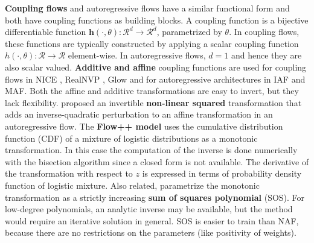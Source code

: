 

\textbf{Coupling flows} and autoregressive flows have a similar functional form and both have coupling functions as building blocks. A coupling function is a bijective differentiable function $\mathbf{h}(\cdot, \theta): \mathcal{R}^{d} \rightarrow \mathcal{R}^{d} $, parametrized by $\theta$. In coupling flows, these functions are typically constructed by applying a scalar coupling function $h(\cdot, \theta): \mathcal{R} \rightarrow \mathcal{R}$ element-wise. In autoregressive flows, $d = 1$ and hence they are also scalar valued. %
\textbf{Additive and affine} coupling functions are used for coupling flows in NICE \cite{dinh2014nice}, RealNVP \cite{dinh2016density}, Glow \cite{kingma2018glow} and for autoregressive architectures in IAF and MAF. Both the affine and additive transformations are easy to invert, but they lack flexibility.
\cite{ziegler2019latent} proposed an invertible \textbf{non-linear squared} transformation that adds an inverse-quadratic perturbation to an affine transformation in an autoregressive flow. 
The \textbf{Flow++ model} \cite{ho2019flow} uses the cumulative distribution function (CDF) of a mixture of logistic distributions as a monotonic transformation. In this case the computation of the inverse is done numerically with the bisection algorithm since a closed form is not available. The derivative of the transformation with respect to $z$ is expressed in terms of probability density function of logistic mixture.
Also related, \cite{Jaini2019} parametrize the monotonic transformation as a strictly increasing \textbf{sum of squares polynomial} (SOS).
For low-degree polynomials, an analytic inverse may be available, but the method would require an iterative solution in general. SOS is easier to train than NAF, because there are no restrictions on the parameters (like positivity of weights).

